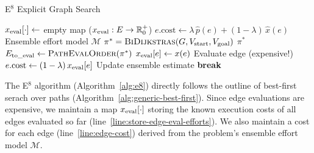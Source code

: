 \begin{algorithm}[t]
\caption{E$^8$ Explicit Graph Search}
\label{alg:e8}
\begin{algorithmic}[1]
   \State $x_{\mbox{\scriptsize eval}}[\cdot] \leftarrow$ empty map
      ($x_{\mbox{\scriptsize eval}} : E \rightarrow \mathbb{R}_0^+$)
      \label{line:store-edge-eval-efforts}
      \State $e.{\mbox{cost}} \leftarrow
         \lambda \, \hat{p}(e) + (1 - \lambda) \, \hat{x}(e)$
         \Comment Ensemble effort model $\mathcal{M}$
         \label{line:edge-cost}
   \EndFor
   \Loop
         \label{line:best-first-start}
      \State $\pi^* = \mbox{\sc BiDijkstras}(G,
         V_{\mbox{\scriptsize start}}, V_{\mbox{\scriptsize goal}})$
         \label{line:e8-select-optimistic-path}
         \State \Return $\pi^*$
            \label{line:return-done}
      \EndIf
      \State $E_{\mbox{\scriptsize to\_eval}} \leftarrow
         \mbox{\sc PathEvalOrder}(\pi^*)$
         \label{line:path-eval-order}
         \State $x_{\mbox{\scriptsize eval}}[e] \leftarrow x(e)$
            \Comment Evaluate edge (expensive!)
            \label{line:evaulate-edge}
         \State $e.{\mbox{cost}} \leftarrow
            (1 - \lambda) \, x_{\mbox{\scriptsize eval}}[e]$
            \Comment Update ensemble estimate
            \label{line:update-estimate}
            \label{line:exec-cost-check}
            \State \textbf{break}
               \label{line:eval-break}
         \EndIf
      \EndFor
   \EndLoop
      \label{line:best-first-end}
   \EndProcedure
\end{algorithmic}
\end{algorithm}

The E$^8$ algorithm (Algorithm~\ref{alg:e8})
directly follows the outline
of best-first serach over paths
(Algorithm~\ref{alg:generic-best-first}).
Since edge evaluations are expensive,
we maintain a map $x_{\mbox{\scriptsize eval}}[\cdot]$
storing the known execution costs of all edges evaluated so far
(line~\ref{line:store-edge-eval-efforts}).
We also maintain a cost for each edge (line~\ref{line:edge-cost})
derived from the problem's ensemble effort model $\mathcal{M}$.

